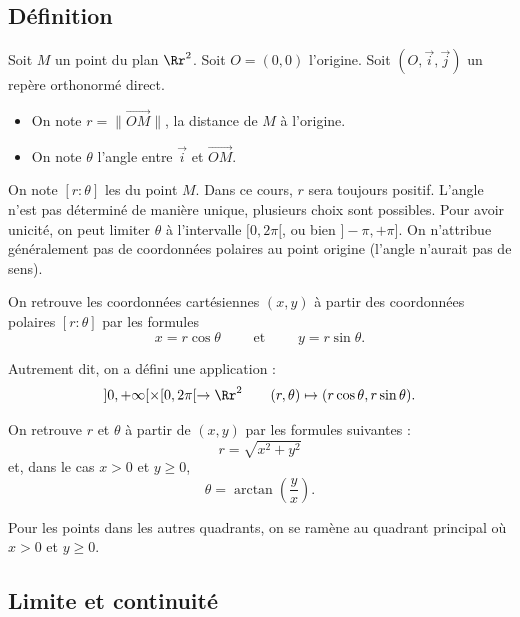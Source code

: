 \documentclass[11pt, class=report,crop=false]{standalone}
\begin{document}
\subsection{Définition}

Soit $M$ un point du plan $\Rr^2$. Soit $O=(0,0)$ l'origine. Soit $(O, \vec i, \vec j)$ un repère orthonormé direct.

\begin{itemize}
  \item On note $r = \| \overrightarrow{OM} \|$, la distance de $M$ à l'origine.
  \item On note $\theta$ l'angle entre $\vec i$ et $\overrightarrow{OM}$.
\end{itemize}


On note $[r:\theta]$ les  du point $M$. Dans ce cours, $r$ sera toujours positif.
L'angle n'est pas déterminé de manière unique, plusieurs choix sont possibles. 
Pour avoir unicité, on peut limiter $\theta$ à l'intervalle $[0,2\pi[$, ou bien 
$]-\pi,+\pi]$. On n'attribue généralement pas de coordonnées polaires au point origine (l'angle n'aurait pas de sens). 

\bigskip
{}

On retrouve les coordonnées cartésiennes $(x,y)$ à partir des coordonnées polaires $[r:\theta]$ par les formules
$$x = r\cos \theta \qquad\text{ et }\qquad y = r \sin \theta.$$

Autrement dit, on a défini une application :
$$
]0,+\infty[\times[0,2\pi[\rightarrow \Rr^2 \qquad (r,\theta)\mapsto (r\cos\theta,r\sin\theta).
$$

\bigskip
{}

On retrouve  $r$ et $\theta$ à partir de $(x,y)$ par les formules suivantes :
$$r = \sqrt{x^2+y^2}$$
et, dans le cas $x>0$ et $y\ge0$, 
$$\theta = \arctan\left(\frac yx\right).$$

Pour les points dans les autres quadrants, on se ramène au quadrant principal où $x>0$ et $y\ge0$.



\subsection{Limite et continuité}
\end{document}
